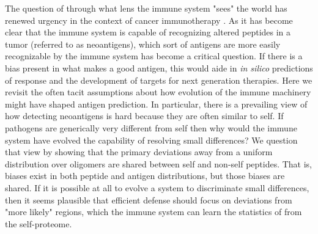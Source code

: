 \documentclass[superscriptaddress,twocolumn,pre]{revtex4}
\newcommand{\<}{\langle}
\renewcommand{\>}{\rangle}
\begin{document}
The question of through what lens the immune system "sees" the world has renewed urgency in the context of cancer immunotherapy \cite{Luksza2017,Balachandran2017,Richman2019}. As it has become clear that the immune system is capable of recognizing altered peptides in a tumor (referred to as neoantigens), which sort of antigens are more easily recognizable by the immune system has become a critical question. If there is a bias present in what makes a good antigen, this would aide in {\it in silico} predictions of response and the development of targets for next generation therapies. Here we revisit the often tacit assumptions about how evolution of the immune machinery might have shaped antigen prediction. In particular, there is a prevailing view of how detecting neoantigens is hard because they are often similar to self. If pathogens are generically very different from self then why would the immune system have evolved the capability of resolving small differences? We question that view by showing that the primary deviations away from a uniform distribution over oligomers are shared between self and non-self peptides. That is, biases exist in both peptide and antigen distributions, but those biases are shared. If it is possible at all to evolve a system to discriminate small differences, then it seems plausible that efficient defense should focus on deviations from "more likely" regions, which the immune system can learn the statistics of from the self-proteome.
\end{document}
